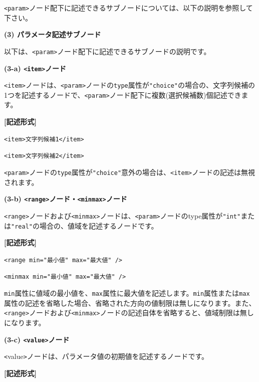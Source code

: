 \documentclass[a4paper,11pt]{jarticle}
\begin{document}
{\texttt{<param>}ノード配下に記述できるサブノードについては、以下の説明を参照して下さい。

\vspace{12pt}
\textbf{(3) パラメータ記述サブノード}

以下は、\texttt{<param>}ノード配下に記述できるサブノードの説明です。

\vspace{12pt}
\textbf{(3-a) \texttt{<item>}ノード }

\parindent=3pt
\texttt{<item>}ノードは、\texttt{<param>}ノードの{\tt type}属性が\texttt{"choice"}の場合の、文字列候補の1つを記述するノードで、\texttt{<param>}ノード配下に複数(選択候補数)個記述できます。

\vspace{8pt}
\parindent=0pt
\leftskip=12pt
\textbf{[記述形式]}

\leftskip=42pt
\texttt{<item>文字列候補1</item>}

\texttt{<item>文字列候補2</item>}

\vspace{8pt}
\leftskip=0pt
\texttt{<param>}ノードの{\tt type}属性が\texttt{"choice"}意外の場合は、\texttt{<item>}ノードの記述は無視されます。

\vspace{12pt}
\textbf{(3-b) \texttt{<range>}ノード・\texttt{<minmax>}ノード}

\texttt{<range>}ノードおよび\texttt{<minmax>}ノードは、\texttt{<param>}ノードのtype属性が\texttt{"int"}または\texttt{"real"}の場合の、値域を記述するノードです。

\vspace{8pt}
\leftskip=12pt
\textbf{[記述形式]}

\leftskip=42pt
\texttt{<range  min="最小値"  max="最大値" />}

\texttt{<minmax  min="最小値"  max="最大値" />}

\vspace{8pt}
\leftskip=0pt
{\tt min}属性に値域の最小値を、{\tt max}属性に最大値を記述します。{\tt min}属性または{\tt max}属性の記述を省略した場合、省略された方向の値制限は無しになります。また、\texttt{<range>}ノードおよび\texttt{<minmax>}ノードの記述自体を省略すると、値域制限は無しになります。

\vspace{12pt}
\textbf{(3-c) \texttt{<value>}ノード}

\texttt{<}value\texttt{>}ノードは、パラメータ値の初期値を記述するノードです。

\vspace{8pt}
\leftskip=12pt
\textbf{[記述形式]}

}
\end{document}
